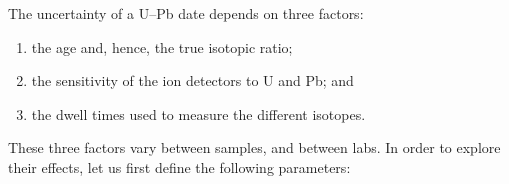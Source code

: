 \documentclass[gchron, manuscript]{copernicus}
\begin{document}











\appendix

The uncertainty of a U--Pb date depends on three factors:

\begin{enumerate}
\item the age and, hence, the true isotopic ratio;
\item the sensitivity of the ion detectors to U and Pb; and
\item the dwell times used to measure the different isotopes.
\end{enumerate}

These three factors vary between samples, and between labs.  In order
to explore their effects, let us first define the following
parameters:
\end{document}
